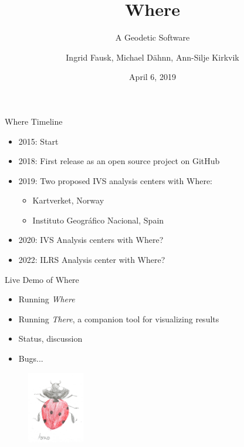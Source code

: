 \documentclass[12pt, english]{beamer}
\title{Where}
\subtitle{A Geodetic Software}
\author{Ingrid Fausk, Michael Dähnn, Ann-Silje Kirkvik}
\date{April 6, 2019}
\begin{document}
\frame[plain]{\titlepage}

\begin{frame}{Where Timeline}
  \begin{itemize}
    \item 2015: Start
    \item 2018: First release as an open source project on GitHub
    \item 2019: Two proposed IVS analysis centers with Where: 
       \begin{itemize}
         \item Kartverket, Norway
         \item Instituto Geográfico Nacional, Spain
       \end{itemize}
    \item 2020: IVS Analysis centers with Where?
    \item 2022: ILRS Analysis center with Where?
  \end{itemize}
\end{frame}

\begin{frame}{Live Demo of Where}
  \begin{itemize}
    \item Running \emph{Where}
    \item Running \emph{There}, a companion tool for visualizing results
    \item Status, discussion
    \item Bugs...
  \end{itemize}
  \begin{figure}
    \begin{flushleft}
      \includegraphics[width=2.5cm]{bug.jpg}
    \end{flushleft}
  \end{figure}     
\end{frame}
\end{document}
